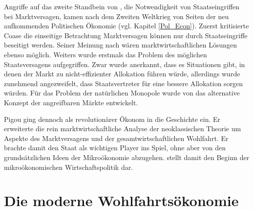 Angriffe auf das zweite Standbein von \textcite{Pigou1920}, die Notwendigkeit von Staatseingriffen bei Marktversagen, kamen nach dem Zweiten Weltkrieg von Seiten der neu aufkommenden Politischen Ökonomie (vgl. Kapitel \ref{Pol_Econ}). Zuerst kritisierte Coase die einseitige Betrachtung Marktversagen können nur durch Staatseingriffe beseitigt werden. Seiner Meinung nach wären marktwirtschaftlichen Lösungen ebenso möglich. Weiters wurde erstmals das Problem des möglichen Staatsversagens aufgegriffen. Zwar wurde anerkannt, dass es Situationen gibt, in denen der Markt zu nicht-effizienter Allokation führen würde, allerdings wurde zunehmend angezweifelt, dass Staatsvertreter für eine bessere Allokation sorgen würden. Für das Problem der natürlichen Monopole wurde von \textcite{Baumol1982} das alternative Konzept der angreifbaren Märkte entwickelt.

Pigou ging dennoch als revolutionärer Ökonom in die Geschichte ein. Er erweiterte die rein marktwirtschaftliche Analyse der neoklassischen Theorie um Aspekte des Marktversagens und der gesamtwirtschaftlichen Wohlfahrt. Er brachte damit den Staat als wichtigen Player ins Spiel, ohne aber von den grundsätzlichen Ideen der Mikroökonomie abzugehen. \textcite{Pigou1920} stellt damit den Beginn der mikroökonomischen Wirtschaftspolitik dar.


\section{Die moderne Wohlfahrtsökonomie}
\label{Wohlfahrt}

